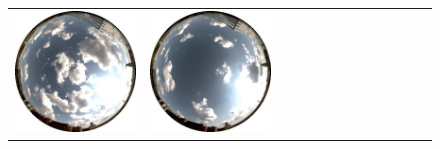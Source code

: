 \begin{figure}
\begin{tabular}{@{}rcccccccccccc@{}}
    \includegraphics[width=\customwidth]{./figures/database/20130824_155938.jpg} &
    \includegraphics[width=\customwidth]{./figures/database/20130824_162933.jpg}
    \\

\end{tabular}
\end{figure}
